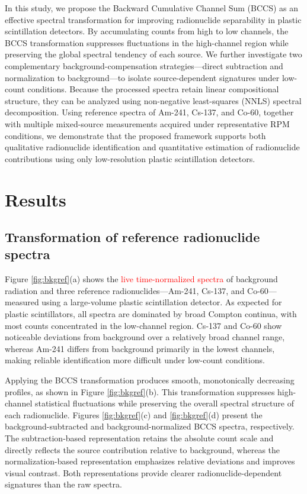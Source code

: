 \documentclass[pdflatex,sn-mathphys-num, table]{sn-jnl}%
\theoremstyle{thmstyleone}%
\theoremstyle{thmstyletwo}%
\theoremstyle{thmstylethree}%
\begin{document}
In this study, we propose the Backward Cumulative Channel Sum (BCCS) as an effective spectral transformation for improving radionuclide separability in plastic scintillation detectors. By accumulating counts from high to low channels, the BCCS transformation suppresses fluctuations in the high-channel region while preserving the global spectral tendency of each source. We further investigate two complementary background-compensation strategies—direct subtraction and normalization to background—to isolate source-dependent signatures under low-count conditions. Because the processed spectra retain linear compositional structure, they can be analyzed using non-negative least-squares (NNLS) spectral decomposition. Using reference spectra of Am-241, Cs-137, and Co-60, together with multiple mixed-source measurements acquired under representative RPM conditions, we demonstrate that the proposed framework supports both qualitative radionuclide identification and quantitative estimation of radionuclide contributions using only low-resolution plastic scintillation detectors.

\section*{Results}

\subsection*{Transformation of reference radionuclide spectra}

Figure \ref{fig:bkgref}(a) shows the \textcolor{red}{live time-normalized spectra} of background radiation and three reference radionuclides---Am-241, Cs-137, and Co-60---measured using a large-volume plastic scintillation detector. As expected for plastic scintillators, all spectra are dominated by broad Compton continua, with most counts concentrated in the low-channel region. Cs-137 and Co-60 show noticeable deviations from background over a relatively broad channel range, whereas Am-241 differs from background primarily in the lowest channels, making reliable identification more difficult under low-count conditions.

Applying the BCCS transformation produces smooth, monotonically decreasing profiles, as shown in Figure \ref{fig:bkgref}(b). This transformation suppresses high-channel statistical fluctuations while preserving the overall spectral structure of each radionuclide. Figures \ref{fig:bkgref}(c) and \ref{fig:bkgref}(d) present the background-subtracted and background-normalized BCCS spectra, respectively. The subtraction-based representation retains the absolute count scale and directly reflects the source contribution relative to background, whereas the normalization-based representation emphasizes relative deviations and improves visual contrast. Both representations provide clearer radionuclide-dependent signatures than the raw spectra.
\end{document}
